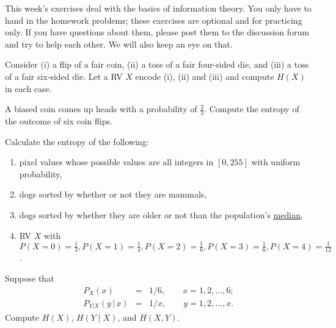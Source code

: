 \documentclass[a4paper,10pt,landscape,twocolumn]{scrartcl}
\begin{document}
\practiceproblems

{\sffamily\noindent
This week's exercises deal with the basics of information theory. You only have to hand in the homework problems; these exercises are optional and for practicing only. If you have questions about them, please post them to the discussion forum and try to help each other. We will also keep an eye on that.
}

\begin{exercise}[entropies]
Consider (i) a flip of a fair coin, (ii) a toss of a fair four-sided die, and (iii) a toss of a fair six-sided die. Let a RV $X$ encode (i), (ii) and (iii) and compute $H(X)$ in each case.
\end{exercise}

\begin{exercise}
A biased coin comes up heads with a probability of $\frac{2}{3}$. Compute the entropy of the outcome of six coin flips.
\end{exercise}

\begin{exercise}
Calculate the entropy of the following:
\begin{enumerate}
\item pixel values whose possible values are all integers in $[0,255]$ with uniform probability, 
\item dogs sorted by whether or not they are mammals, 
\item dogs sorted by whether they are older or not than the population's \href{https://en.wikipedia.org/wiki/Median}{median}, 
\item RV $X$ with $P(X = 0) = \frac{1}{3}, P(X = 1) = \frac{1}{4}, P(X = 2) = \frac{1}{6}, P(X = 3) = \frac{1}{6}, P(X = 4) = \frac{1}{12}$.
\end{enumerate}
\end{exercise}

\begin{exercise}
Suppose that
\begin{eqnarray*}
P_{X}(x) & = & 1/6,\qquad x=1,2,\ldots,6;\\
P_{Y|X}(y\,|\, x) & = & 1/x,\qquad y=1,2,\ldots,x.
\end{eqnarray*}
Compute $H(X)$, $H(Y \mid X)$, and $H(X,Y)$.
\end{exercise}
\end{document}
